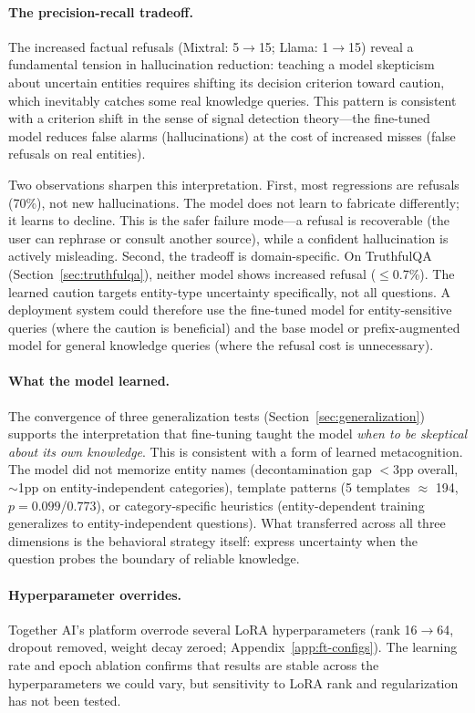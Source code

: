 \paragraph{The precision-recall tradeoff.} The increased factual refusals (Mixtral: 5$\to$15; Llama: 1$\to$15) reveal a fundamental tension in hallucination reduction: teaching a model skepticism about uncertain entities requires shifting its decision criterion toward caution, which inevitably catches some real knowledge queries. This pattern is consistent with a criterion shift in the sense of signal detection theory---the fine-tuned model reduces false alarms (hallucinations) at the cost of increased misses (false refusals on real entities).

Two observations sharpen this interpretation. First, most regressions are refusals (70\%), not new hallucinations. The model does not learn to fabricate differently; it learns to decline. This is the safer failure mode---a refusal is recoverable (the user can rephrase or consult another source), while a confident hallucination is actively misleading. Second, the tradeoff is domain-specific. On TruthfulQA (Section~\ref{sec:truthfulqa}), neither model shows increased refusal ($\leq$0.7\%). The learned caution targets entity-type uncertainty specifically, not all questions. A deployment system could therefore use the fine-tuned model for entity-sensitive queries (where the caution is beneficial) and the base model or prefix-augmented model for general knowledge queries (where the refusal cost is unnecessary).

\paragraph{What the model learned.} The convergence of three generalization tests (Section~\ref{sec:generalization}) supports the interpretation that fine-tuning taught the model \emph{when to be skeptical about its own knowledge}. This is consistent with a form of learned metacognition. The model did not memorize entity names (decontamination gap $<$3pp overall, ${\sim}$1pp on entity-independent categories), template patterns (5 templates $\approx$ 194, $p = 0.099$/$0.773$), or category-specific heuristics (entity-dependent training generalizes to entity-independent questions). What transferred across all three dimensions is the behavioral strategy itself: express uncertainty when the question probes the boundary of reliable knowledge.

\paragraph{Hyperparameter overrides.} Together AI's platform overrode several LoRA hyperparameters (rank 16$\to$64, dropout removed, weight decay zeroed; Appendix~\ref{app:ft-configs}). The learning rate and epoch ablation confirms that results are stable across the hyperparameters we could vary, but sensitivity to LoRA rank and regularization has not been tested.

